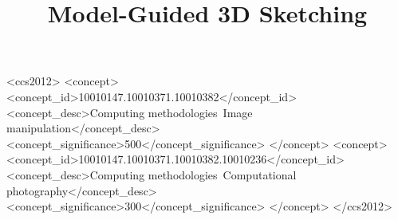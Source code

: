 \documentclass[review]{acmsiggraph}
\title{Model-Guided 3D Sketching}
\author{}
\begin{document}


\maketitle

\begin{abstract}



\end{abstract}

%
%
\begin{CCSXML}
<ccs2012>
<concept>
<concept_id>10010147.10010371.10010382</concept_id>
<concept_desc>Computing methodologies~Image manipulation</concept_desc>
<concept_significance>500</concept_significance>
</concept>
<concept>
<concept_id>10010147.10010371.10010382.10010236</concept_id>
<concept_desc>Computing methodologies~Computational photography</concept_desc>
<concept_significance>300</concept_significance>
</concept>
</ccs2012>
\end{CCSXML}


%
%


\keywordlist

\conceptlist

\printcopyright












\nocite{}

\end{document}
